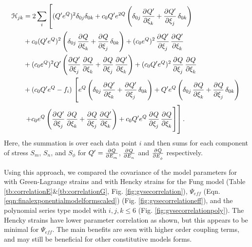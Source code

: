 \begin{equation}	
\begin{aligned}
\mathcal{H}_{jk} &= 2\sum_i\left[ (Q^\prime e^Q)^2  \delta_{0j}\delta_{0k} + c_0Q^\prime e^{2Q} \left(\delta_{0j}\dpd{Q^\prime}{\xi_k} + \dpd{Q^\prime}{\xi_j} \delta_{0k}\right) \right.	\\
&+ c_0 (Q^\prime e^Q)^2 \left(\delta_{0j}\dpd{Q}{\xi_k} + \dpd{Q}{\xi_j}\delta_{0k}\right) + (c_0 e^Q)^2 \dpd{Q^\prime}{\xi_j}\dpd{Q^\prime}{\xi_k} \\
&+  (c_0e^Q)^2Q^\prime \left( \dpd{Q^\prime}{\xi_j}\dpd{Q}{\xi_k}	+ \dpd{Q}{\xi_j}\dpd{Q^\prime}{\xi_k}\right) + (c_0Q^\prime e^Q)^2 \dpd{Q}{\xi_j}\dpd{Q}{\xi_k} \\
&+ (c_0Q^\prime e^Q - f_i)\left.\left[ e^Q \left(\delta_{0j}\dpd{Q^\prime}{\xi_k} + \dpd{Q^\prime}{\xi_j}\delta_{0k}\right) + Q^\prime e^Q \left(\delta_{0j}\dpd{Q}{\xi_k}  + \dpd{Q}{\xi_j}\delta_{0k}\right)
\right.\right.	\\
&\left.\left.+ c_0 e^Q\left(\dpd{Q^\prime}{\xi_j}\dpd{Q}{\xi_k}  +  \dpd{Q}{\xi_j}\dpd{Q^\prime}{\xi_k}\right)
+ c_0Q^\prime e^Q \dpd{Q}{\xi_j}\dpd{Q}{\xi_k} \right]\right].
\end{aligned}
\end{equation}
Here, the summation is over each data point $i$ and then sums for each component of stress $S_m$, $S_n$, and $S_\phi$ for $Q^\prime = \pd{Q}{E_m}$, $\pd{Q}{E_n}$ and $\pd{Q}{E_\phi}$ respectively. 

	Using this approach, we compared the covariance of the model parameters for with Green-Lagrange strains and with Hencky strains for the Fung model (Table \ref{tb:correlationE}\&\ref{tb:correlationG}, Fig. \ref{fig:gvsecorrelation}), $\Psi_{eff}$ (Eqn. \ref{eqn:finalexponentialmodelformscaled}) (Fig. \ref{fig:gvsecorrelationeff}), and the polynomial series type model with $i,j,k \leq 6$ (Fig. \ref{fig:gvsecorrelationpoly}). The Hencky strains have lower parameter correlation as shown, but this appears to be minimal for $\Psi_{eff}$. The main benefits are seen with higher order coupling terms, and may still be beneficial for other constitutive models forms. 



